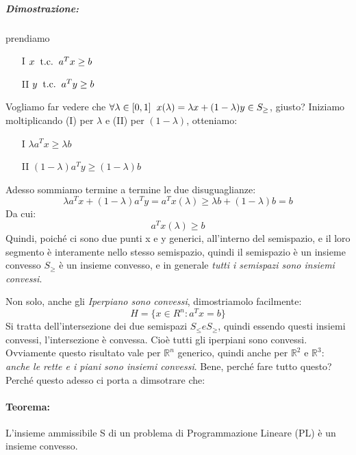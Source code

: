 \subparagraph{Dimostrazione:} prendiamo
\begin{itemize}
    \item[I] $x \hspace{0.2cm} \text{t.c.} \hspace{0.2cm} a^Tx \geq b$ 
    \item[II] $y \hspace{0.2cm} \text{t.c.} \hspace{0.2cm} a^Ty \geq b$ 
\end{itemize}
Vogliamo far vedere che $\forall \lambda \in [0,1] \hspace{0.2cm} x(\lambda) = \lambda x + (1 - \lambda)y \in S_{\geq}$, giusto? Iniziamo moltiplicando (I) per $\lambda$ e (II) per $(1-\lambda)$, otteniamo:
\begin{itemize}
    \item[I] $\lambda a^Tx \geq \lambda b$ 
    \item[II] $(1-\lambda)a^Ty \geq (1-\lambda) b$ 
\end{itemize}
Adesso sommiamo termine a termine le due disuguaglianze:
\begin{equation*}
    \lambda a^Tx + (1-\lambda)a^Ty = a^Tx(\lambda) \geq \lambda b + (1-\lambda) b = b
\end{equation*} 
Da cui:
\begin{equation*}
    a^Tx(\lambda) \geq b
\end{equation*}
Quindi, poiché ci sono due punti x e y generici, all'interno del semispazio, e il loro segmento è interamente nello stesso semispazio, 
quindi il semispazio è un insieme convesso $S_{\geq}$ è un insieme convesso, e in generale \textit{tutti i semispazi sono insiemi convessi}.

\vspace{1cm}

\noindent Non solo, anche gli \textit{Iperpiano sono convessi}, dimostriamolo facilmente:
\begin{equation*}
    H = \{x \in R^n: a^Tx = b\}
\end{equation*}
Si tratta dell'intersezione dei due semispazi $S_{\leq} e S_{\geq}$, quindi essendo questi insiemi convessi, l'intersezione è convessa. Cioè tutti gli iperpiani sono convessi. Ovviamente questo risultato vale per $\mathbb{R}^n$ generico, quindi anche per $\mathbb{R}^2$ e $\mathbb{R}^3$: \textit{anche le rette e i piani sono insiemi convessi}. Bene, perché fare tutto questo? Perché questo adesso ci porta a dimsotrare che:

\paragraph{Teorema:} L'insieme ammissibile S di un problema di Programmazione Lineare (PL) è un insieme convesso. 

